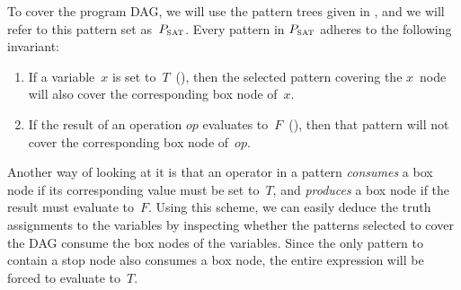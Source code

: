%
%        
%
%        
%
%
%      
%
%

\def\mPSat{P_\text{\smaller SAT}}%

To cover the \gls{program DAG}, we will use the \glspl{pattern tree} given in
, and we will refer to this \gls{pattern set}
as~$\mPSat$.
%
 Every \gls{pattern} in $\mPSat$ adheres to the following
invariant:
\begin{enumerate}
  \item If a variable~$x$ is set to~$T$~(\tTrue), then the selected
    \gls{pattern} covering the $x$~\gls{node} will also cover the corresponding
    \gls{box node} of~$x$.
  \item If the result of an operation $\mathit{op}$ evaluates to~$F$~(\tFalse),
    then that \gls{pattern} will not cover the corresponding \gls{box node}
    of~$\mathit{op}$.
\end{enumerate}
Another way of looking at it is that an operator in a \gls{pattern}
\emph{consumes} a \gls{box node} if its corresponding value must be set to~$T$,
and \emph{produces} a \gls{box node} if the result must evaluate to~$F$.
%
Using
this scheme, we can easily deduce the truth assignments to the variables by
inspecting whether the \glspl{pattern} selected to cover the \gls{DAG} consume
the \glspl{box node} of the variables.
%
Since the only \gls{pattern} to contain a
\gls{stop node} also consumes a \gls{box node}, the entire expression will be
forced to evaluate to~$T$.

